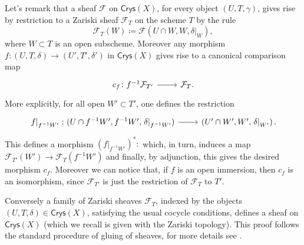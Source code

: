 \documentclass[../Main]{subfiles}
\begin{document}
\begin{rem}
	Let's remark that a sheaf $\mathcal{F}$ on $\mathsf{Crys}(X)$, for every
	object $\left(U, T, \gamma\right)$, gives rise by restriction
	to a Zariski sheaf $\mathcal{F}_T$ on the scheme $T$ by the rule
	\begin{equation*}
	\mathcal{F}_T(W) \coloneqq
	\mathcal{F}(U \cap W, W, \left.\delta\right|_{W})
	,\end{equation*}
	where $W \subset T$ is an open subscheme.
	Moreover any morphism 
	$f\colon \left(U, T, \delta\right) \to \left(U', T', \delta'\right)$
	in $\mathsf{Crys}(X)$
	gives rise to a canonical comparison map
	\begin{equation*}
	\begin{tikzcd}[row sep = 0ex
		,/tikz/column 1/.append style={anchor=base east}
		,/tikz/column 2/.append style={anchor=base west}]
		c_f\colon f^{-1}\mathcal{F}_{T'} \arrow[r, "", rightarrow] &
		\mathcal{F}_T
	.\end{tikzcd}
	\end{equation*} 
	More explicitly, for all open $W' \subset T'$, one defines the restriction
	\begin{equation*}
	\begin{tikzcd}[row sep = 0ex
		,/tikz/column 1/.append style={anchor=base east}
		,/tikz/column 2/.append style={anchor=base west}]
		\left.f\right|_{f^{-1}W'}\colon 
		(U \cap f^{-1}W', f^{-1}W', \left.\delta\right|_{f^{-1}W'} )
		\arrow[r, "", rightarrow] &
		\left(U' \cap W', W', \left.\delta\right|_{W'} \right)
	.\end{tikzcd}
	\end{equation*} 
	This defines a morphism $(\left.f\right|_{f^{-1}W'})^*\colon$
	which, in turn, induces a map $\mathcal{F}_{T'}(W') \to \mathcal{F}_T(f^{-1}W')$
	and finally, by adjunction, this gives the desired morphism $c_f$.
	Moreover we can notice that, if $f$ is an open immersion, then
	$c_f$ is an isomorphism, since $\mathcal{F}_{T'}$ is just the restriction
	of $\mathcal{F}_T$ to $T'$.

	Conversely a family of Zariski sheaves $\mathcal{F}_T$, indexed by 
	the objects $\left(U, T, \delta\right) \in \mathsf{Crys}(X)$, satisfying
	the usual cocycle conditions, defines a sheaf on $\mathsf{Crys}(X)$ 
	(which we recall is given with the Zariski topology).
	This proof follows the standard procedure of gluing of sheaves,
	for more details see
	\cite[\href{https://stacks.math.columbia.edu/tag/07IN}{Section 07IN}]{SP}.
\end{rem}
\end{document}
